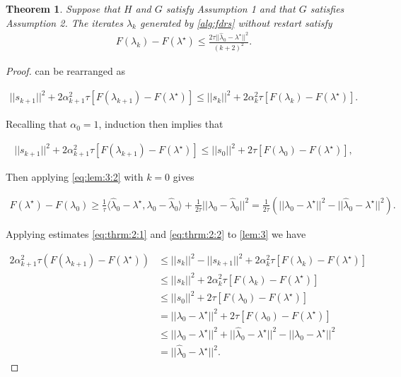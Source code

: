 \documentclass[11pt]{article}
\newcommand{\inner}[2]{\langle #1, #2\rangle}
\newtheorem{thrm}{Theorem}
\begin{document}
\begin{thrm}
Suppose that $H$ and $G$ satisfy Assumption 1 and that $G$ satisfies Assumption 2.  The iterates $\lambda_k$ generated by \cref{alg:fdrs} without restart satisfy
\begin{align*}
F(\lambda_k) - F(\lambda^\star) \le \frac{2\tau||\hat\lambda_0 - \lambda^\star||^2}{(k+2)^2}.
\end{align*}
\end{thrm}

\begin{proof}
 can be rearranged as

\begin{align*}
||s_{k+1}||^2 + 2\alpha_{k+1}^2 \tau\left[F(\lambda_{k+1}) - F(\lambda^\star)\right] \le ||s_k||^2 + 2\alpha_k^2\tau \left[F(\lambda_k) - F(\lambda^\star)\right].
\end{align*}

Recalling that $\alpha_0 = 1$, induction then implies that 

\begin{align}
\label{eq:thrm:2:1}
||s_{k+1}||^2 + 2\alpha_{k+1}^2 \tau\left[F(\lambda_{k+1}) - F(\lambda^\star)\right] \le ||s_0||^2 + 2\tau \left[F(\lambda_0) - F(\lambda^\star)\right],
\end{align}

Then applying \cref{eq:lem:3:2} with $k = 0$ gives

\begin{align}
\label{eq:thrm:2:2}
F(\lambda^\star) - F(\lambda_0) \ge \frac 1\tau\inner{\hat\lambda_0 - \lambda^\star}{\lambda_0 - \hat\lambda_0} + \frac 1{2\tau}||\lambda_0 - \hat\lambda_0||^2 = \frac 1{2\tau}\left(||\lambda_0 - \lambda^\star||^2 - ||\hat\lambda_0 - \lambda^\star||^2\right).
\end{align}

Applying estimates \cref{eq:thrm:2:1} and \cref{eq:thrm:2:2} to \cref{lem:3} we have 

\begin{align*}
2\alpha_{k+1}^2\tau(F(\lambda_{k+1}) - F(\lambda^\star)) &\le ||s_k||^2 - ||s_{k+1}||^2 + 2\alpha_k^2\tau\left[F(\lambda_k) - F(\lambda^\star)\right] \\
&\le ||s_k||^2 + 2\alpha_k^2\tau\left[F(\lambda_k) - F(\lambda^\star)\right] \\
&\le ||s_0||^2 + 2\tau\left[F(\lambda_0) - F(\lambda^\star)\right] \\
&= ||\lambda_0 - \lambda^\star||^2 + 2\tau\left[F(\lambda_0) - F(\lambda^\star)\right] \\
&\le ||\lambda_0 - \lambda^\star||^2 + ||\hat\lambda_0 - \lambda^\star||^2 - ||\lambda_0 - \lambda^\star||^2 \\
&= ||\hat\lambda_0 - \lambda^\star||^2.
\end{align*}


\end{proof}
\end{document}
